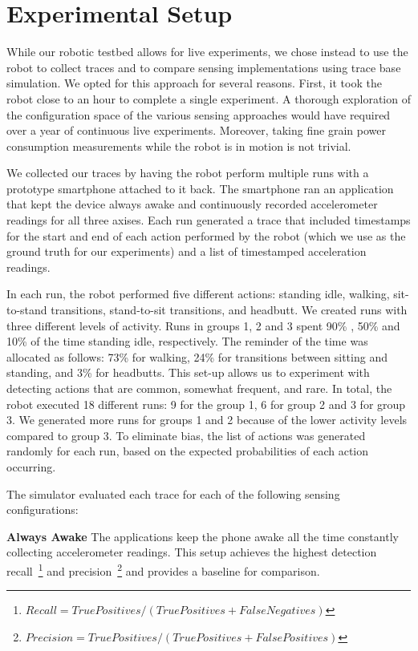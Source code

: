 \section{Experimental Setup}
\label{sec:experimentalSetup}

While our robotic testbed allows for live experiments, we chose
instead to use the robot to collect traces and to compare sensing
implementations using trace base simulation.  We opted for this
approach for several reasons.  First, it took the robot close to an
hour to complete a single experiment.  A thorough exploration of the
configuration space of the various sensing approaches would have
required over a year of continuous live experiments.  Moreover, taking
fine grain power consumption measurements while the robot is in motion
is not trivial.

We collected our traces by having the robot perform multiple runs with
a prototype smartphone attached to it back.  The smartphone ran an
application that kept the device always awake and continuously recorded
accelerometer readings for all three axises.  Each run generated a
trace that included timestamps for the start and end of each action
performed by the robot (which we use as the ground truth for our
experiments) and a list of timestamped acceleration readings.

In each run, the robot performed five different actions: standing
idle, walking, sit-to-stand transitions, stand-to-sit transitions, and
headbutt.  We created runs with three different levels of activity.
Runs in groups 1, 2 and 3 spent 90\% , 50\% and 10\% of the time
standing idle, respectively. The reminder of the time was allocated as
follows: 73\% for walking, 24\% for transitions between sitting and
standing, and 3\% for headbutts.  This set-up allows us to experiment
with detecting actions that are common, somewhat frequent, and rare.
In total, the robot executed 18 different runs: 9 for the group 1, 6
for group 2 and 3 for group 3.  We generated more runs for groups 1
and 2 because of the lower activity levels compared to group 3. To
eliminate bias, the list of actions was generated randomly for each
run, based on the expected probabilities of each action occurring.

The simulator evaluated each trace for each of the following sensing
configurations:

\textbf{Always Awake} The applications keep the phone awake all the
time constantly collecting accelerometer readings.  This setup
achieves the highest detection
recall~\footnote{$Recall=TruePositives/(TruePositives+FalseNegatives)$}
and
precision~\footnote{$Precision=TruePositives/(TruePositives+FalsePositives)$}
and provides a baseline for comparison.

